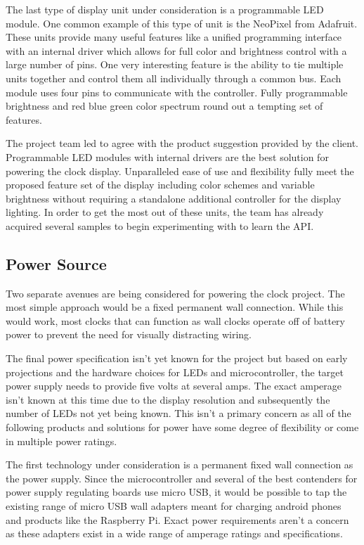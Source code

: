 \documentclass[onecolumn, draftclsnofoot,10pt, compsoc]{IEEEtran}
\begin{document}
The last type of display unit under consideration is a programmable LED module.
One common example of this type of unit is the NeoPixel from Adafruit. \cite{led3}
These units provide many useful features like a unified programming interface with an internal driver which allows for full color and brightness control with a large number of pins.
One very interesting feature is the ability to tie multiple units together and control them all individually through a common bus.
Each module uses four pins to communicate with the controller.
Fully programmable brightness and red blue green color spectrum round out a tempting set of features.

The project team led to agree with the product suggestion provided by the client.
Programmable LED modules with internal drivers are the best solution for powering the clock display.
Unparalleled ease of use and flexibility fully meet the proposed feature set of the display including color schemes and variable brightness without requiring a standalone additional controller for the display lighting.
In order to get the most out of these units, the team has already acquired several samples to begin experimenting with to learn the API.

\subsection{Power Source}

Two separate avenues are being considered for powering the clock project.
The most simple approach would be a fixed permanent wall connection.
While this would work, most clocks that can function as wall clocks operate off of battery power to prevent the need for visually distracting wiring.

The final power specification isn’t yet known for the project but based on early projections and the hardware choices for LEDs and microcontroller, the target power supply needs to provide five volts at several amps.
The exact amperage isn’t known at this time due to the display resolution and subsequently the number of LEDs not yet being known.
This isn’t a primary concern as all of the following products and solutions for power have some degree of flexibility or come in multiple power ratings.

The first technology under consideration is a permanent fixed wall connection as the power supply.
Since the microcontroller and several of the best contenders for power supply regulating boards use micro USB, it would be possible to tap the existing range of micro USB wall adapters meant for charging android phones and products like the Raspberry Pi.
Exact power requirements aren’t a concern as these adapters exist in a wide range of amperage ratings and specifications.
\end{document}
